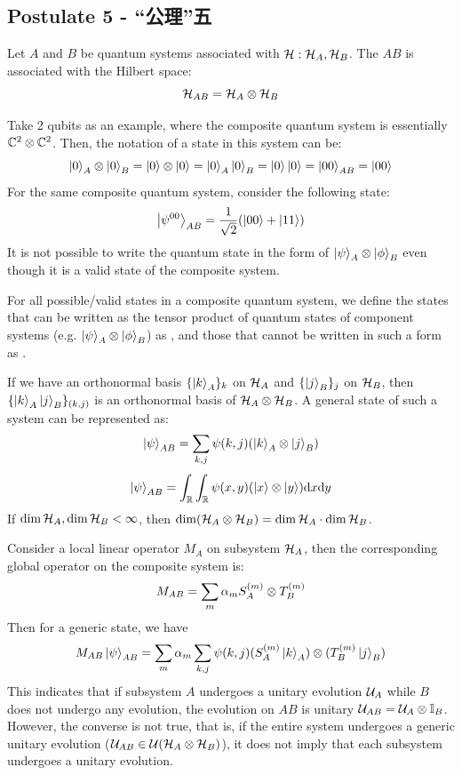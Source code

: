 \subsection{Postulate 5 - “公理”五}
\begin{postulate}
    Let $A$ and $B$ be quantum systems associated with $\mathcal{H}: \mathcal{H}_A, \mathcal{H}_B$. The  $AB$ is associated with the Hilbert space:
    $$\mathcal{H}_{AB} = \mathcal{H}_A \otimes \mathcal{H}_B$$
\end{postulate}
Take 2 qubits as an example, where the composite quantum system is essentially $\mathbb{C}^2 \otimes \mathbb{C}^2$. Then, the notation of a state in this system can be:
$$\ket{0}_A \otimes \ket{0}_B = \ket{0} \otimes \ket{0} = \ket{0}_A\ket{0}_B = \ket{0}\ket{0} = \ket{00}_{AB} = \ket{00}$$
For the same composite quantum system, consider the following state:
$$\ket{\psi^{00}}_{AB} = \frac{1}{\sqrt{2}}(\ket{00} + \ket{11})$$
It is not possible to write the quantum state in the form of $\ket{\psi}_A \otimes \ket{\phi}_B$ even though it is a valid state of the composite system.
\begin{definition}
    For all possible/valid states in a composite quantum system, we define the states that can be written as the tensor product of quantum states of component systems (e.g. $\ket{\psi}_A \otimes \ket{\phi}_B$) as , and those that cannot be written in such a form as .
\end{definition}
If we have an orthonormal basis $\{\ket{k}_A\}_k$ on $\mathcal{H}_A$ and $\{\ket{j}_B\}_j$ on $\mathcal{H}_B$, then $\{\ket{k}_A\ket{j}_B\}_{(k, j)}$ is an orthonormal basis of $\mathcal{H}_A \otimes \mathcal{H}_B$. A general state of such a system can be represented as:
$$\ket{\psi}_{AB} = \sum_{k, j}\psi(k, j)(\ket{k}_A \otimes \ket{j}_B)$$
$$\ket{\psi}_{AB} = \int_{\mathbb{R}}\int_{\mathbb{R}} \psi(x, y)(\ket{x} \otimes \ket{y}) \dd x \dd y$$
If $\dim \mathcal{H}_A, \dim \mathcal{H}_B < \infty$, then $\dim (\mathcal{H}_A \otimes \mathcal{H}_B) = \dim \mathcal{H}_A \cdot \dim \mathcal{H}_B$. \par
Consider a local linear operator $M_A$ on subsystem $\mathcal{H}_A$, then the corresponding global operator on the composite system is:
$$M_{AB} = \sum_{m} \alpha_m S_A^{(m)} \otimes T_B^{(m)}$$
Then for a generic state, we have
$$M_{AB}\ket{\psi}_{AB} = \sum_{m} \alpha_m \sum_{k, j} \psi(k, j)(S_A^{(m)} \ket{k}_A) \otimes (T_B^{(m)} \ket{j}_B)$$
This indicates that if subsystem $A$ undergoes a unitary evolution $\mathcal{U}_A$ while $B$ does not undergo any evolution, the evolution on $AB$ is unitary $\mathcal{U}_{AB} = \mathcal{U}_A \otimes \mathbb{I}_B$. However, the converse is not true, that is, if the entire system undergoes a generic unitary evolution ($\mathcal{U}_{AB} \in \mathcal{U}(\mathcal{H}_A \otimes \mathcal{H}_B)$), it does not imply that each subsystem undergoes a unitary evolution. \par
